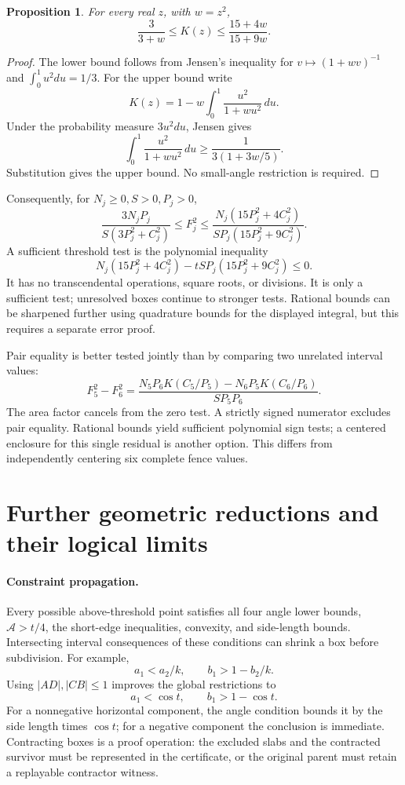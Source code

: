 \documentclass[11pt]{article}
\newtheorem{proposition}{Proposition}
\newcommand{\Area}{\mathcal A}
\begin{document}
\begin{proposition}
For every real \(z\), with \(w=z^2\),
\[
 \frac{3}{3+w}\le K(z)\le\frac{15+4w}{15+9w}.
\]
\end{proposition}
\begin{proof}
The lower bound follows from Jensen's inequality for
\(v\mapsto(1+wv)^{-1}\) and \(\int_0^1u^2du=1/3\).
For the upper bound write
\[
 K(z)=1-w\int_0^1\frac{u^2}{1+wu^2}\,du.
\]
Under the probability measure \(3u^2du\), Jensen gives
\[
 \int_0^1\frac{u^2}{1+wu^2}\,du
 \ge\frac{1}{3(1+3w/5)}.
\]
Substitution gives the upper bound. No small-angle restriction is required.
\end{proof}
Consequently, for \(N_j\ge0,S>0,P_j>0\),
\[
 \frac{3N_jP_j}{S(3P_j^2+C_j^2)}
 \le F_j^2\le
 \frac{N_j(15P_j^2+4C_j^2)}
      {SP_j(15P_j^2+9C_j^2)}.
\]
A sufficient threshold test is the polynomial inequality
\[
 N_j(15P_j^2+4C_j^2)
   -tSP_j(15P_j^2+9C_j^2)\le0.
\]
It has no transcendental operations, square roots, or divisions.
It is only a sufficient test; unresolved boxes continue to stronger tests.
Rational bounds can be sharpened further using quadrature bounds for the
displayed integral, but this requires a separate error proof.

Pair equality is better tested jointly than by comparing two unrelated
interval values:
\[
 F_5^2-F_6^2
 =\frac{N_5P_6K(C_5/P_5)-N_6P_5K(C_6/P_6)}{SP_5P_6}.
\]
The area factor cancels from the zero test. A strictly signed numerator
excludes pair equality. Rational bounds yield sufficient polynomial sign
tests; a centered enclosure for this single residual is another option.
This differs from independently centering six complete fence values.

\section{Further geometric reductions and their logical limits}
\paragraph{Constraint propagation.}
Every possible above-threshold point satisfies all four angle lower bounds,
\(\Area>t/4\), the short-edge inequalities, convexity, and side-length bounds.
Intersecting interval consequences of these conditions can shrink a box
before subdivision. For example,
\[
 a_1<a_2/k,\qquad b_1>1-b_2/k.
\]
Using \(|AD|,|CB|\le1\) improves the global restrictions to
\[
 a_1<\cos t,\qquad b_1>1-\cos t.
\]
For a nonnegative horizontal component, the angle condition bounds it by
the side length times \(\cos t\); for a negative component the conclusion
is immediate. Contracting boxes is a proof operation: the excluded slabs
and the contracted survivor must be represented in the certificate, or the
original parent must retain a replayable contractor witness.
\end{document}
